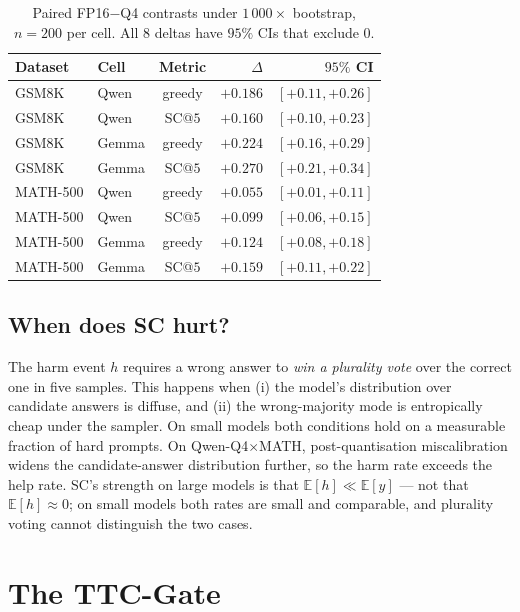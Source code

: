 \documentclass[11pt]{article}
\begin{document}
\begin{table}[t]
\centering\small
\setlength{\tabcolsep}{3pt}
\begin{tabular}{@{}llcrr@{}}
\toprule
Dataset & Cell & Metric & $\Delta$ & $95\%$ CI \\
\midrule
GSM8K    & Qwen  & greedy & $+0.186$ & $[+0.11, +0.26]$ \\
GSM8K    & Qwen  & SC@$5$ & $+0.160$ & $[+0.10, +0.23]$ \\
GSM8K    & Gemma & greedy & $+0.224$ & $[+0.16, +0.29]$ \\
GSM8K    & Gemma & SC@$5$ & $+0.270$ & $[+0.21, +0.34]$ \\
MATH-500 & Qwen  & greedy & $+0.055$ & $[+0.01, +0.11]$ \\
MATH-500 & Qwen  & SC@$5$ & $+0.099$ & $[+0.06, +0.15]$ \\
MATH-500 & Gemma & greedy & $+0.124$ & $[+0.08, +0.18]$ \\
MATH-500 & Gemma & SC@$5$ & $+0.159$ & $[+0.11, +0.22]$ \\
\bottomrule
\end{tabular}
\caption{Paired FP16${-}$Q4 contrasts under $1\,000{\times}$
bootstrap, $n{=}200$ per cell. All 8 deltas have $95\%$ CIs that
exclude $0$.}
\label{tab:q4}
\end{table}

\subsection{When does SC hurt?}

The harm event $h$ requires a wrong answer to \emph{win a plurality
vote} over the correct one in five samples. This happens when (i)
the model's distribution over candidate answers is diffuse, and
(ii) the wrong-majority mode is entropically cheap under the
sampler. On small models both conditions hold on a measurable
fraction of hard prompts. On Qwen-Q4${\times}$MATH, post-quantisation
miscalibration widens the candidate-answer distribution further, so
the harm rate exceeds the help rate. SC's strength on large models
is that $\mathbb{E}[h]\ll\mathbb{E}[y]$ --- not that
$\mathbb{E}[h]\approx 0$; on small models both rates are small and
comparable, and plurality voting cannot distinguish the two cases.

\section{The TTC-Gate}
\label{sec:method}
\end{document}

